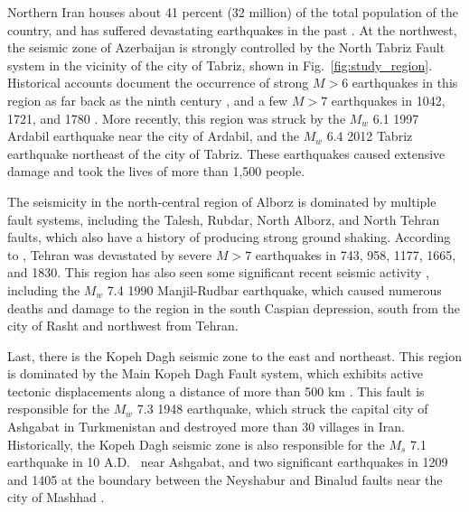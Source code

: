 Northern Iran houses about 41 percent (32 million) of the total population of the country, and has suffered devastating earthquakes in the past \citep[e.g.,][]{Mehrain_1990_Tech, Chafory-Ashtiany_1999_DPM, Razzaghi_2012_Tech}. At the northwest, the seismic zone of Azerbaijan is strongly controlled by the North Tabriz Fault system in the vicinity of the city of Tabriz, shown in Fig.~\ref{fig:study_region}. Historical accounts document the occurrence of strong $M>6$ earthquakes in this region as far back as the ninth century \citep{Berberian1999}, and a few $M>7$ earthquakes in 1042, 1721, and 1780 \citep{Jones1834}. More recently, this region was struck by the $M_w$ 6.1 1997 Ardabil earthquake near the city of Ardabil, and the $M_w$ 6.4 2012 Tabriz earthquake northeast of the city of Tabriz. These earthquakes caused extensive damage and took the lives of more than 1,500 people. 

The seismicity in the north-central region of Alborz is dominated by multiple fault systems, including the Talesh, Rubdar, North Alborz, and North Tehran faults, which also have a history of producing strong ground shaking. According to \citet{Ambraseys_1982_Book}, Tehran was devastated by severe $M>7$ earthquakes in 743, 958, 1177, 1665, and 1830. This region has also seen some significant recent seismic activity \citep{Berberian1999}, including the $M_w$ 7.4 1990 Manjil-Rudbar earthquake, which caused numerous deaths and damage to the region in the south Caspian depression, south from the city of Rasht and northwest from Tehran. 

Last, there is the Kopeh Dagh seismic zone to the east and northeast. This region is dominated by the Main Kopeh Dagh Fault system, which exhibits active tectonic displacements along a distance of more than 500 km \citep{Trifonov1978}. This fault is responsible for the $M_w$ 7.3 1948 earthquake, which struck the capital city of Ashgabat in Turkmenistan and destroyed more than 30 villages in Iran. Historically, the Kopeh Dagh seismic zone is also responsible for the $M_s$ 7.1 earthquake in 10 A.D.~\citep{Berberian2001} near Ashgabat, and two significant earthquakes in 1209 and 1405 at the boundary between the Neyshabur and Binalud faults near the city of Mashhad \citep{Berberian1999}.

